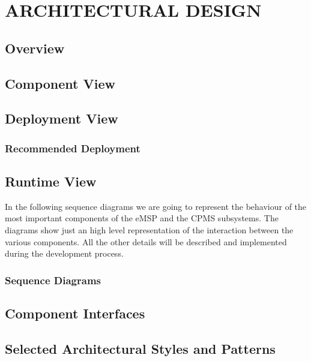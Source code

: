 \chapter{ARCHITECTURAL DESIGN}
\label{ch:architecturalDesign}%

\section{Overview}
\label{sec:overview}

\section{Component View} %
\label{sec:componentView}

\section{Deployment View}
\label{sec:deploymentView}
\subsection{Recommended Deployment}
\label{subsec:recommendedDeployment}
\section{Runtime View}
\label{sec:runtimeView}
In the following sequence diagrams we are going to represent the behaviour of the most important components of the eMSP and the CPMS subsystems. The diagrams show just an high level representation of the interaction between the various components. All the other details will be described and implemented during the development process.
\subsection{Sequence Diagrams}
\label{subsec:sequenceDiagrams}
\section{Component Interfaces} %
\label{sec:componentInterfaces}

\section{Selected Architectural Styles and Patterns} %
\label{sec:artchitecturalStylesPatterns}
